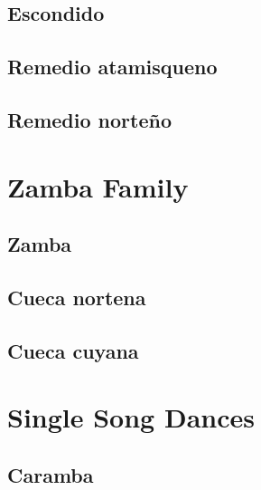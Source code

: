 \section{Escondido}
\label{sec:escondido}

\section{Remedio atamisqueno}
\label{sec:remedio_atamisqueno}

\section{Remedio norteño}
\label{sec:remedio_norteno}

\chapter{Zamba Family}
\label{chap:zamba}

\section{Zamba}
\label{sec:zamba}

\section{Cueca nortena}
\label{sec:cueca_nortena}

\section{Cueca cuyana}
\label{sec:cueca_cuyana}

\chapter{Single Song Dances}
\label{chap:singlesong}

\section{Caramba}
\label{sec:caramba}

